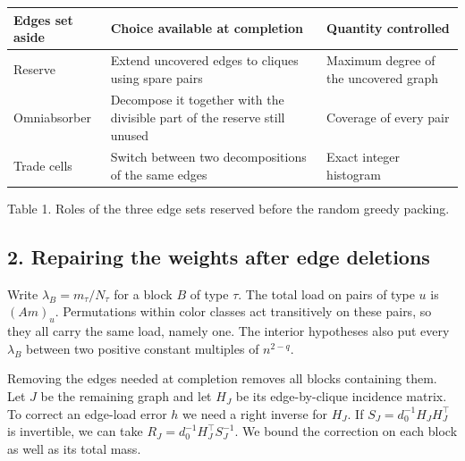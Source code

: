 \documentclass[english,11pt,a4paper]{article}
\newcounter{none}
\begin{document}
{\def\LTcaptype{none} %
\begin{longtable}[]{@{}
  >{\raggedright\arraybackslash}p{}
  >{\raggedright\arraybackslash}p{}
  >{\raggedright\arraybackslash}p{}@{}}
\toprule\noalign{}
\begin{minipage}[b]{\linewidth}\raggedright
Edges set aside
\end{minipage} & \begin{minipage}[b]{\linewidth}\raggedright
Choice available at completion
\end{minipage} & \begin{minipage}[b]{\linewidth}\raggedright
Quantity controlled
\end{minipage} \\
\midrule\noalign{}
\endhead
\bottomrule\noalign{}
\endlastfoot
Reserve & Extend uncovered edges to cliques using spare pairs & Maximum degree of the uncovered graph \\
Omniabsorber & Decompose it together with the divisible part of the reserve still unused & Coverage of every pair \\
Trade cells & Switch between two decompositions of the same edges & Exact integer histogram \\
\end{longtable}
}

Table 1. Roles of the three edge sets reserved before the random greedy packing.

\subsection{2. Repairing the weights after edge deletions}\label{repairing-the-weights-after-edge-deletions}

Write \(\lambda_B=m_\tau/N_\tau\) for a block \(B\) of type \(\tau\). The total load on pairs of type \(u\) is \((Am)_u\). Permutations within color classes act transitively on these pairs, so they all carry the same load, namely one. The interior hypotheses also put every \(\lambda_B\) between two positive constant multiples of \(n^{2-q}\).

Removing the edges needed at completion removes all blocks containing them. Let \(J\) be the remaining graph and let \(H_J\) be its edge-by-clique incidence matrix. To correct an edge-load error \(h\) we need a right inverse for \(H_J\). If \(S_J=d_0^{-1}H_JH_J^\top\) is invertible, we can take \(R_J=d_0^{-1}H_J^\top S_J^{-1}\). We bound the correction on each block as well as its total mass.
\end{document}
